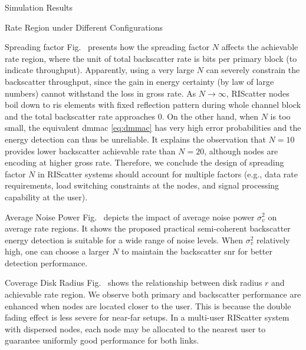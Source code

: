 \documentclass[journal]{IEEEtran}
\begin{document}
\begin{section}{Simulation Results}
\begin{subsection}{Rate Region under Different Configurations}
		\begin{subsubsection}{Spreading factor}
			Fig.~ presents how the spreading factor $N$ affects the achievable rate region, where the unit of total backscatter rate is bits per primary block (to indicate throughput).
			Apparently, using a very large $N$ can severely constrain the backscatter throughput, since the gain in energy certainty (by law of large numbers) cannot withstand the loss in gross rate.
			As $N \to \infty$, RIScatter nodes boil down to \gls{ris} elements with fixed reflection pattern during whole channel block and the total backscatter rate approaches \num{0}.
			On the other hand, when $N$ is too small, the equivalent \gls{dmmac} \eqref{eq:dmmac} has very high error probabilities and the energy detection can thus be unreliable.
			It explains the observation that $N=10$ provides lower backscatter achievable rate than $N=20$, although nodes are encoding at higher gross rate.
			Therefore, we conclude the design of spreading factor $N$ in RIScatter systems should account for multiple factors (e.g., data rate requirements, load switching constraints at the nodes, and signal processing capability at the user).
		\end{subsubsection}

		\begin{subsubsection}{Average Noise Power}
			Fig.~ depicts the impact of average noise power $\sigma_v^2$ on average rate regions.
			It shows the proposed practical semi-coherent backscatter energy detection is suitable for a wide range of noise levels.
			When $\sigma_v^2$ relatively high, one can choose a larger $N$ to maintain the backscatter \gls{snr} for better detection performance.
		\end{subsubsection}

		\begin{subsubsection}{Coverage Disk Radius}
			Fig.~ shows the relationship between disk radius $r$ and achievable rate region.
			We observe both primary and backscatter performance are enhanced when nodes are located closer to the user.
			This is because the double fading effect is less severe for near-far setups.
			In a multi-user RIScatter system with dispersed nodes, each node may be allocated to the nearest user to guarantee uniformly good performance for both links.
		\end{subsubsection}
	\end{subsection}
	\label{st:simulation_results}
\end{section}
\end{document}
